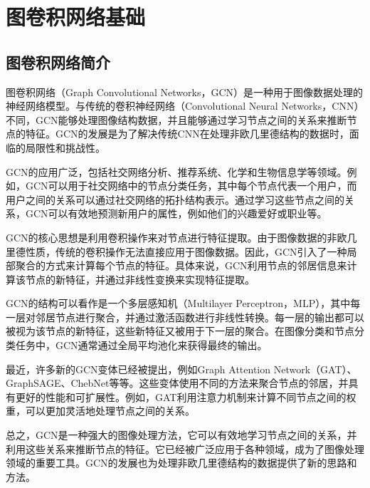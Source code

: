 \chapter{图卷积网络基础}
\section{图卷积网络简介}
图卷积网络（Graph Convolutional Networks，GCN）是一种用于图像数据处理的神经网络模型。与传统的卷积神经网络（Convolutional Neural Networks，CNN）不同，GCN能够处理图像结构数据，并且能够通过学习节点之间的关系来推断节点的特征。GCN的发展是为了解决传统CNN在处理非欧几里德结构的数据时，面临的局限性和挑战性。

GCN的应用广泛，包括社交网络分析、推荐系统、化学和生物信息学等领域。例如，GCN可以用于社交网络中的节点分类任务，其中每个节点代表一个用户，而用户之间的关系可以通过社交网络的拓扑结构表示。通过学习这些节点之间的关系，GCN可以有效地预测新用户的属性，例如他们的兴趣爱好或职业等。

GCN的核心思想是利用卷积操作来对节点进行特征提取。由于图像数据的非欧几里德性质，传统的卷积操作无法直接应用于图像数据。因此，GCN引入了一种局部聚合的方式来计算每个节点的特征。具体来说，GCN利用节点的邻居信息来计算该节点的新特征，并通过非线性变换来实现特征提取。

GCN的结构可以看作是一个多层感知机（Multilayer Perceptron，MLP），其中每一层对邻居节点进行聚合，并通过激活函数进行非线性转换。每一层的输出都可以被视为该节点的新特征，这些新特征又被用于下一层的聚合。在图像分类和节点分类任务中，GCN通常通过全局平均池化来获得最终的输出。

最近，许多新的GCN变体已经被提出，例如Graph Attention Network（GAT）、GraphSAGE、ChebNet等等。这些变体使用不同的方法来聚合节点的邻居，并具有更好的性能和可扩展性。例如，GAT利用注意力机制来计算不同节点之间的权重，可以更加灵活地处理节点之间的关系。

总之，GCN是一种强大的图像处理方法，它可以有效地学习节点之间的关系，并利用这些关系来推断节点的特征。它已经被广泛应用于各种领域，成为了图像处理领域的重要工具。GCN的发展也为处理非欧几里德结构的数据提供了新的思路和方法。

